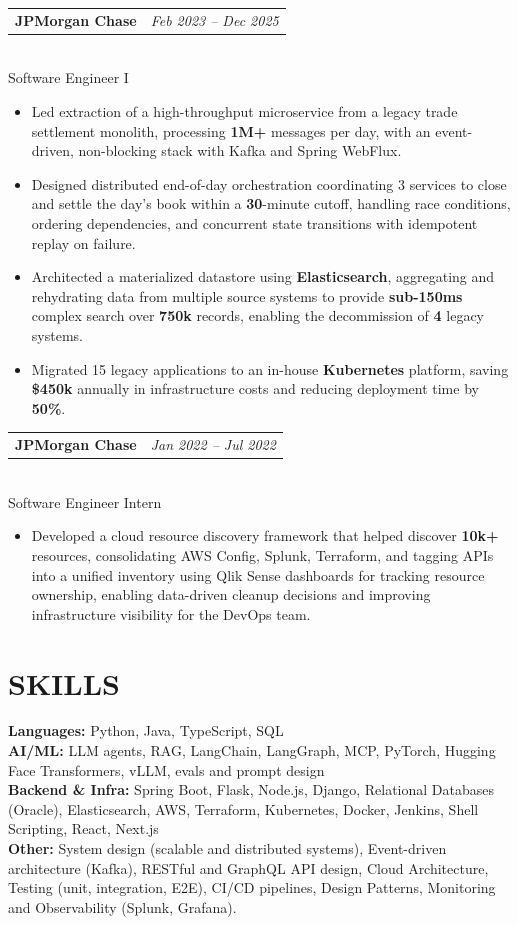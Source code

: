 \documentclass[10pt,letterpaper]{article}
\makeatletter
\newcommand{\entry}[2]{%
  \begin{tabularx}{\textwidth}{@{}X r@{}}\textbf{#1} & \textit{#2}\end{tabularx}\\[-1pt]}
\makeatother
\begin{document}
\vspace{1.9pt}
\entry{JPMorgan Chase}{Feb 2023 -- Dec 2025}
Software Engineer I
\begin{itemize}
  \item Led extraction of a high-throughput microservice from a legacy trade settlement monolith, processing \textbf{1M+} messages per day, with an event-driven, non-blocking stack with Kafka and Spring WebFlux.
  \item Designed distributed end-of-day orchestration coordinating 3 services to close and settle the day's book within a \textbf{30}-minute cutoff, handling race conditions, ordering dependencies, and concurrent state transitions with idempotent replay on failure.
  \item Architected a materialized datastore using \textbf{Elasticsearch}, aggregating and rehydrating data from multiple source systems to provide \textbf{sub-150ms} complex search over \textbf{750k} records, enabling the decommission of \textbf{4} legacy systems.
  \item Migrated 15 legacy applications to an in-house \textbf{Kubernetes} platform, saving \textbf{\$450k} annually in infrastructure costs and reducing deployment time by \textbf{50\%}.
\end{itemize}

\vspace{1.9pt}
\entry{JPMorgan Chase}{Jan 2022 -- Jul 2022}
Software Engineer Intern
\begin{itemize}
  \item Developed a cloud resource discovery framework that helped discover \textbf{10k+} resources, consolidating AWS Config, Splunk, Terraform, and tagging APIs into a unified inventory using Qlik Sense dashboards for tracking resource ownership, enabling data-driven cleanup decisions and improving infrastructure visibility for the DevOps team.
\end{itemize}

\section{SKILLS}
\textbf{Languages:} Python, Java, TypeScript, SQL\\
\textbf{AI/ML:} LLM agents, RAG, LangChain, LangGraph, MCP, PyTorch, Hugging Face Transformers, vLLM, evals and prompt design\\
\textbf{Backend \& Infra:} Spring Boot, Flask, Node.js, Django, Relational Databases (Oracle), Elasticsearch, AWS, Terraform, Kubernetes, Docker, Jenkins, Shell Scripting, React, Next.js\\
\textbf{Other:} System design (scalable and distributed systems), Event-driven architecture (Kafka), RESTful and GraphQL API design, Cloud Architecture, Testing (unit, integration, E2E), CI/CD pipelines, Design Patterns, Monitoring and Observability (Splunk, Grafana).
\end{document}
